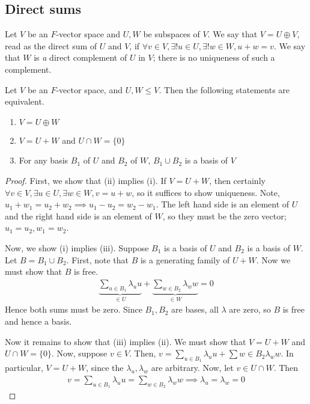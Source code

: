     \subsection{Direct sums}
    \begin{definition}
        Let $V$ be an $F$-vector space and $U, W$ be subspaces of $V$.
        We say that $V = U \oplus V$, read as the direct sum of $U$ and $V$, if $\forall v \in V, \exists!
        u \in U, \exists!
        w \in W, u + w = v$.
        We say that $W$ is \textit{a} direct complement of $U$ in $V$; there is no uniqueness of such a complement.
    \end{definition}
    \begin{lemma}
        Let $V$ be an $F$-vector space, and $U, W \leq V$.
        Then the following statements are equivalent.
        \begin{enumerate}
            \item $V = U \oplus W$
            \item $V = U + W$ and $U \cap W = \{0\}$
            \item For any basis $B_1$ of $U$ and $B_2$ of $W$, $B_1 \cup B_2$ is a basis of $V$
        \end{enumerate}
    \end{lemma}
    \begin{proof}
        First, we show that (ii) implies (i).
        If $V = U + W$, then certainly $\forall v \in V, \exists u \in U, \exists w \in W, v = u + w$, so it suffices to show uniqueness.
        Note, $u_1 + w_1 = u_2 + w_2 \implies u_1 - u_2 = w_2 - w_1$.
        The left hand side is an element of $U$ and the right hand side is an element of $W$, so they must be the zero vector; $u_1 = u_2, w_1 = w_2$.

        Now, we show (i) implies (iii).
        Suppose $B_1$ is a basis of $U$ and $B_2$ is a basis of $W$.
        Let $B = B_1 \cup B_2$.
        First, note that $B$ is a generating family of $U + W$.
        Now we must show that $B$ is free.
        \begin{align*}
            \underbrace{\sum_{u \in B_1} \lambda_u u}_{\in U} + \underbrace{\sum_{w \in B_2} \lambda_w w}_{\in W} = 0
        \end{align*}
        Hence both sums must be zero.
        Since $B_1, B_2$ are bases, all $\lambda$ are zero, so $B$ is free and hence a basis.

        Now it remains to show that (iii) implies (ii).
        We must show that $V = U + W$ and $U \cap W = \{0\}$.
        Now, suppose $v \in V$.
        Then, $v = \sum_{u \in B_1} \lambda_u u + \sum{w \in B_2} \lambda_w w$.
        In particular, $V = U + W$, since the $\lambda_u, \lambda_w$ are arbitrary.
        Now, let $v \in U \cap W$.
        Then
        \begin{align*}
            v = \sum_{u \in B_1} \lambda_u u = \sum_{w \in B_2} \lambda_w w \implies \lambda_u = \lambda_w = 0
        \end{align*}
    \end{proof}

